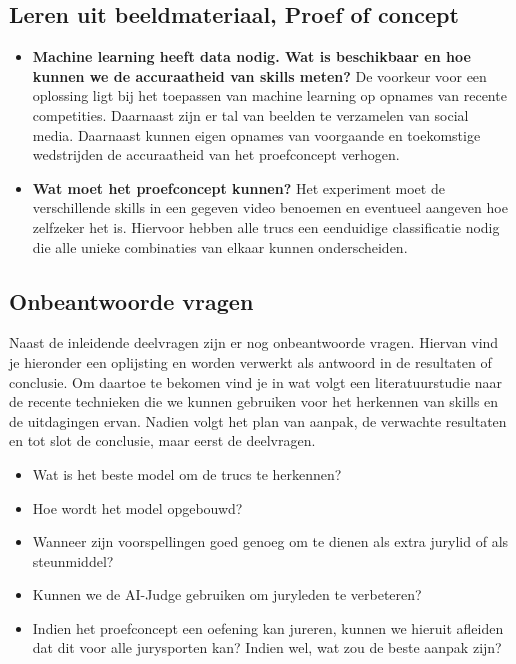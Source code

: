 \subsection{Leren uit beeldmateriaal, Proef of concept}
\begin{itemize}
    \item \textbf{Machine learning heeft data nodig. Wat is beschikbaar en hoe kunnen we de accuraatheid van skills meten?}
    De voorkeur voor een oplossing ligt bij het toepassen van machine learning op opnames van recente competities. Daarnaast zijn er tal van beelden te verzamelen van social media. Daarnaast kunnen eigen opnames van voorgaande en toekomstige wedstrijden de accuraatheid van het proefconcept verhogen.
    
    \item \textbf{Wat moet het proefconcept kunnen?}
    Het experiment moet de verschillende skills in een gegeven video benoemen en eventueel aangeven hoe zelfzeker het is. Hiervoor hebben alle trucs een eenduidige classificatie nodig die alle unieke combinaties van elkaar kunnen onderscheiden.
\end{itemize}

\subsection{Onbeantwoorde vragen}

Naast de inleidende deelvragen zijn er nog onbeantwoorde vragen. Hiervan vind je hieronder een oplijsting en worden verwerkt als antwoord in de resultaten of conclusie. Om daartoe te bekomen vind je in wat volgt een literatuurstudie naar de recente technieken die we kunnen gebruiken voor het herkennen van skills en de uitdagingen ervan. Nadien volgt het plan van aanpak, de verwachte resultaten en tot slot de conclusie, maar eerst de deelvragen.

\begin{itemize}
    \item Wat is het beste model om de trucs te herkennen?
    \item Hoe wordt het model opgebouwd?
    \item Wanneer zijn voorspellingen goed genoeg om te dienen als extra jurylid of als steunmiddel?
    \item Kunnen we de AI-Judge gebruiken om juryleden te verbeteren?
    \item Indien het proefconcept een oefening kan jureren, kunnen we hieruit afleiden dat dit voor alle jurysporten kan? Indien wel, wat zou de beste aanpak zijn?
\end{itemize}

